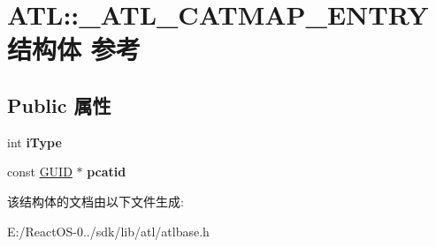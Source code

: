 \hypertarget{struct_a_t_l_1_1___a_t_l___c_a_t_m_a_p___e_n_t_r_y}{}\section{A\+TL\+:\+:\+\_\+\+A\+T\+L\+\_\+\+C\+A\+T\+M\+A\+P\+\_\+\+E\+N\+T\+R\+Y结构体 参考}
\label{struct_a_t_l_1_1___a_t_l___c_a_t_m_a_p___e_n_t_r_y}
\subsection*{Public 属性}
\begin{DoxyCompactItemize}
\item 
\mbox{\label{struct_a_t_l_1_1___a_t_l___c_a_t_m_a_p___e_n_t_r_y_aaf30791dd703019006c281b2ed107f90}} 
int {\bfseries i\+Type}
\item 
\mbox{\label{struct_a_t_l_1_1___a_t_l___c_a_t_m_a_p___e_n_t_r_y_aa25b0106ac1256740fd7cc0b82cef827}} 
const \hyperlink{interface_g_u_i_d}{G\+U\+ID} $\ast$ {\bfseries pcatid}
\end{DoxyCompactItemize}


该结构体的文档由以下文件生成\+:\begin{DoxyCompactItemize}
\item 
E\+:/\+React\+O\+S-\/0../sdk/lib/atl/atlbase.\+h\end{DoxyCompactItemize}
